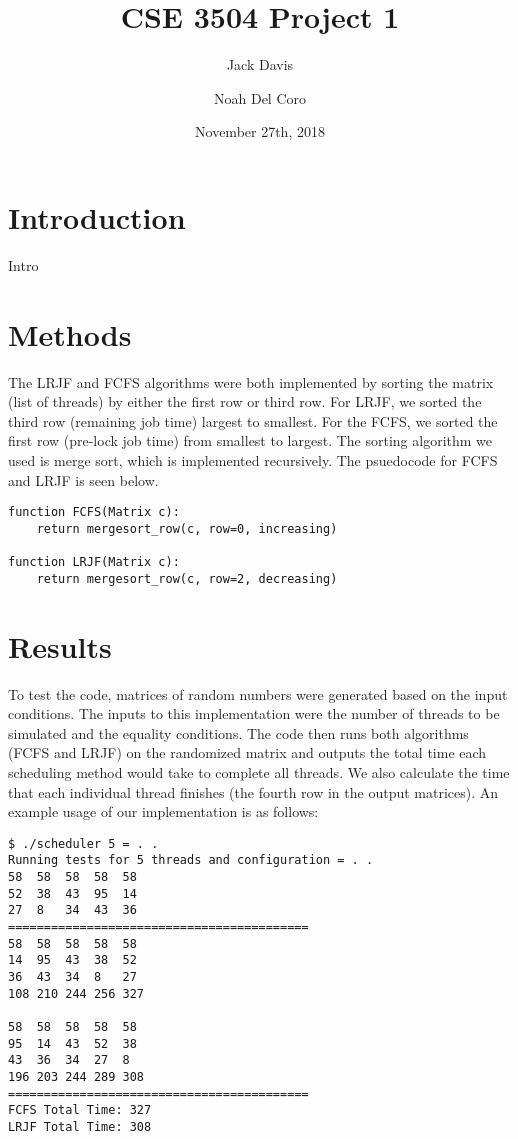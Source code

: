 \documentclass[letterpaper,12pt]{article}
\begin{document}
\title{CSE 3504  Project 1}
\author[1]{Jack Davis}
\author[1]{Noah Del Coro}
\date{November 27th, 2018}
\maketitle

\section{Introduction}
Intro


\section{Methods}
The LRJF and FCFS algorithms were both implemented by sorting the matrix (list of threads) by either the first row or third row. 
For LRJF, we sorted the third row (remaining job time) largest to smallest.
For the FCFS, we sorted the first row (pre-lock job time) from smallest to largest.
The sorting algorithm we used is merge sort, which is implemented recursively. 
The psuedocode for FCFS and LRJF is seen below.
\begin{verbatim}
function FCFS(Matrix c):
    return mergesort_row(c, row=0, increasing)
    
function LRJF(Matrix c):
    return mergesort_row(c, row=2, decreasing)
\end{verbatim}


\section{Results}

To test the code, matrices of random numbers were generated based on the input conditions.
The inputs to this implementation were the number of threads to be simulated and the equality conditions.
The code then runs both algorithms (FCFS and LRJF) on the randomized matrix and outputs the total time each scheduling method would take to complete all threads. We also calculate the time that each individual thread finishes (the fourth row in the output matrices). An example usage of our implementation is as follows:

\begin{verbatim}
$ ./scheduler 5 = . .
Running tests for 5 threads and configuration = . .
58	58	58	58	58	
52	38	43	95	14	
27	8	34	43	36	
==========================================
58	58	58	58	58	
14	95	43	38	52	
36	43	34	8	27	
108	210	244	256	327	

58	58	58	58	58	
95	14	43	52	38	
43	36	34	27	8	
196	203	244	289	308
==========================================
FCFS Total Time: 327
LRJF Total Time: 308
\end{verbatim}
\end{document}
